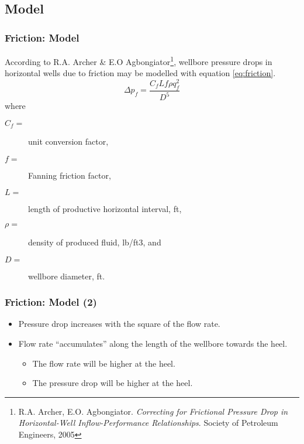 \subsection{Model}
\begin{frame}
    \frametitle{Friction: Model}
    According to R.A. Archer \& E.O Agbongiator\footnote{R.A. Archer, E.O. Agbongiator. \emph{Correcting for Frictional Pressure Drop in Horizontal-Well Inflow-Performance Relationships}. Society of Petroleum Engineers, 2005}, wellbore pressure drops in horizontal wells due to friction may be modelled with equation \ref{eq:friction}.
    \begin{equation}
        \label{eq:friction}
        \Delta p_f = \frac{C_f L f \rho q_f^2}{D^5}
    \end{equation}
    where
    \begin{description}
        \item[$C_f=$] unit conversion factor, 
        \item[$f=$] Fanning friction factor,
        \item[$L=$] length of productive horizontal interval, ft,
        \item[$\rho=$] density of produced fluid, lb/ft3, and
        \item[$D=$] wellbore diameter, ft.
    \end{description}
\end{frame}



\begin{frame}
    \frametitle{Friction: Model (2)}
    \begin{itemize}
            \item Pressure drop increases with the square of the flow rate.
            \item Flow rate ``accumulates'' along the length of the wellbore towards the heel.
            \begin{itemize}
                \item The flow rate will be higher at the heel.
                \item The pressure drop will be higher at the heel.
            \end{itemize}
        \end{itemize}    
\end{frame}


